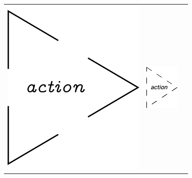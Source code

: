 \begin{longtable}{|m{}|m{}|m{}|}
    \\\hline
    \centering
    \includegraphics[width=0.75\linewidth]{chapters/4-MDC_model_application/image/bvl-action-o.png}
    &
    \centering
    \includegraphics[width=0.75\linewidth]{chapters/4-MDC_model_application/image/bvl-action.png}

\end{longtable}
